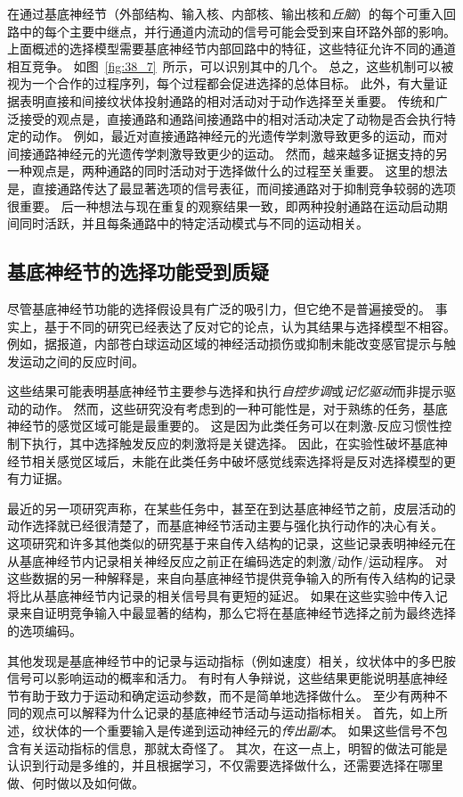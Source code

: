 在通过基底神经节（外部结构、输入核、内部核、输出核和\textit{丘脑}）的每个可重入回路中的每个主要中继点，并行通道内流动的信号可能会受到来自环路外部的影响。
上面概述的选择模型需要基底神经节内部回路中的特征，这些特征允许不同的通道相互竞争。
如图~\ref{fig:38_7}~所示，可以识别其中的几个。
总之，这些机制可以被视为一个合作的过程序列，每个过程都会促进选择的总体目标。
此外，有大量证据表明直接和间接纹状体投射通路的相对活动对于动作选择至关重要。
传统和广泛接受的观点是，直接通路和通路间接通路中的相对活动决定了动物是否会执行特定的动作。
例如，最近对直接通路神经元的光遗传学刺激导致更多的运动，而对间接通路神经元的光遗传学刺激导致更少的运动。
然而，越来越多证据支持的另一种观点是，两种通路的同时活动对于选择做什么的过程至关重要。
这里的想法是，直接通路传达了最显著选项的信号表征，而间接通路对于抑制竞争较弱的选项很重要。
后一种想法与现在重复的观察结果一致，即两种投射通路在运动启动期间同时活跃，并且每条通路中的特定活动模式与不同的运动相关。



\subsection{基底神经节的选择功能受到质疑}

尽管基底神经节功能的选择假设具有广泛的吸引力，但它绝不是普遍接受的。
事实上，基于不同的研究已经表达了反对它的论点，认为其结果与选择模型不相容。
例如，据报道，内部苍白球运动区域的神经活动损伤或抑制未能改变感官提示与触发运动之间的反应时间。


这些结果可能表明基底神经节主要参与选择和执行\textit{自控步调}或\textit{记忆驱动}而非提示驱动的动作。
然而，这些研究没有考虑到的一种可能性是，对于熟练的任务，基底神经节的感觉区域可能是最重要的。
这是因为此类任务可以在刺激-反应习惯性控制下执行，其中选择触发反应的刺激将是关键选择。
因此，在实验性破坏基底神经节相关感觉区域后，未能在此类任务中破坏感觉线索选择将是反对选择模型的更有力证据。


最近的另一项研究声称，在某些任务中，甚至在到达基底神经节之前，皮层活动的动作选择就已经很清楚了，而基底神经节活动主要与强化执行动作的决心有关。
这项研究和许多其他类似的研究基于来自传入结构的记录，这些记录表明神经元在从基底神经节内记录相关神经反应之前正在编码选定的刺激/动作/运动程序。
对这些数据的另一种解释是，来自向基底神经节提供竞争输入的所有传入结构的记录将比从基底神经节内记录的相关信号具有更短的延迟。
如果在这些实验中传入记录来自证明竞争输入中最显著的结构，那么它将在基底神经节选择之前为最终选择的选项编码。


其他发现是基底神经节中的记录与运动指标（例如速度）相关，纹状体中的多巴胺信号可以影响运动的概率和活力。
有时有人争辩说，这些结果更能说明基底神经节有助于致力于运动和确定运动参数，而不是简单地选择做什么。
至少有两种不同的观点可以解释为什么记录的基底神经节活动与运动指标相关。
首先，如上所述，纹状体的一个重要输入是传递到运动神经元的\textit{传出副本}。
如果这些信号不包含有关运动指标的信息，那就太奇怪了。
其次，在这一点上，明智的做法可能是认识到行动是多维的，并且根据学习，不仅需要选择做什么，还需要选择在哪里做、何时做以及如何做。


